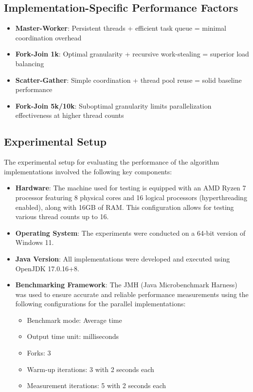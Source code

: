 \subsection{Implementation-Specific Performance Factors}

\begin{itemize}
   \item \textbf{Master-Worker}: Persistent threads + efficient task queue = minimal coordination overhead
   \item \textbf{Fork-Join 1k}: Optimal granularity + recursive work-stealing = superior load balancing
   \item \textbf{Scatter-Gather}: Simple coordination + thread pool reuse = solid baseline performance
   \item \textbf{Fork-Join 5k/10k}: Suboptimal granularity limits parallelization effectiveness at higher thread counts
\end{itemize}

\subsection{Experimental Setup}
The experimental setup for evaluating the performance of the algorithm implementations involved the following key components:

\begin{itemize}
   \item \textbf{Hardware}: The machine used for testing is equipped with an AMD Ryzen 7 processor featuring 8 physical cores and 16 logical processors (hyperthreading enabled), along with 16GB of RAM. This configuration allows for testing various thread counts up to 16.
   \item \textbf{Operating System}: The experiments were conducted on a 64-bit version of Windows 11.
   \item \textbf{Java Version}: All implementations were developed and executed using OpenJDK 17.0.16+8.
   \item \textbf{Benchmarking Framework}: The JMH (Java Microbenchmark Harness) was used to ensure accurate and reliable performance measurements using the following configurations for the parallel implementations:
   \begin{itemize}
   \item Benchmark mode: Average time
   \item Output time unit: milliseconds
   \item Forks: 3
   \item Warm-up iterations: 3 with 2 seconds each
   \item Measurement iterations: 5 with 2 seconds each
   \end{itemize}
\end{itemize}